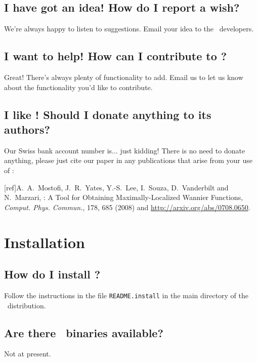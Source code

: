 \subsection{I have got an idea! How do I report a wish?}

We're always happy to listen to suggestions. Email your idea to the
  \wannier\ developers.

\subsection{I want to help! How can I contribute to \wannier?}

Great! There's always plenty of functionality to add. Email us 
to let us know about the functionality you'd like to contribute. 

\subsection{I like \wannier! Should I donate anything to its authors?}

Our Swiss bank account number is... just kidding! There is no need to
donate anything, please just cite our paper in any publications that
arise from your use of \wannier:

[ref]A.~A.~Mostofi, J.~R.~Yates, Y.-S.~Lee, I.~Souza,
   D.~Vanderbilt and N.~Marzari, \wannier: A Tool for Obtaining
   Maximally-Localized Wannier Functions, {\it Comput. Phys. Commun.},
   178, 685 (2008) and \url{http://arxiv.org/abs/0708.0650}.

\section{Installation}

\subsection{How do I install \wannier?\label{sec:installation}}

Follow the instructions in the file {\tt README.install} in the main
directory of the \wannier\ distribution.

\subsection{Are there \wannier\ binaries available?}

Not at present.

